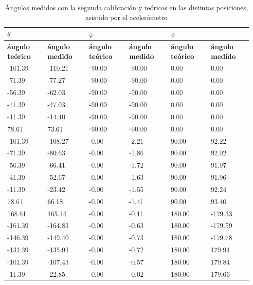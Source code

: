 \documentclass[main]{subfiles}
\begin{document}
\begin{table}
\begin{tabular}{|p{50pt}|p{50pt}|p{50pt}|p{51pt}|p{50pt}|p{50pt}|}
\hline
  
\multicolumn{2}{|p{113pt}|}{\cellcolor[gray]{0.6} $\theta$}  
& \multicolumn{2}{|p{114pt}|}{\cellcolor[gray]{0.6} $\varphi$}
& \multicolumn{2}{|p{113pt}|}{\cellcolor[gray]{0.6} $\psi$} 
\\ \hline 
   

 \multicolumn{1}{|p{50pt}|}{\cellcolor[gray]{0.7} \textbf{\'angulo te\'orico }} 
& \multicolumn{1}{|p{50pt}|}{\cellcolor[gray]{0.8} \textbf{ángulo medido}}
& \multicolumn{1}{|p{50pt}|}{\cellcolor[gray]{0.7} \textbf{\'angulo te\'orico }} 
& \multicolumn{1}{|p{50pt}|}{\cellcolor[gray]{0.8} \textbf{ángulo medido}}
& \multicolumn{1}{|p{50pt}|}{\cellcolor[gray]{0.7} \textbf{\'angulo te\'orico }} 
& \multicolumn{1}{|p{50pt}|}{\cellcolor[gray]{0.8} \textbf{ángulo medido}}
\\ \hline

-101.39&-110.21&-90.00&-90.00&  0.00&   0.00\\ \hline
 -71.39& -77.27&-90.00&-90.00&  0.00&   0.00\\ \hline
 -56.39& -62.03&-90.00&-90.00&  0.00&   0.00\\ \hline
 -41.39& -47.03&-90.00&-90.00&  0.00&   0.00\\ \hline
 -11.39& -14.40&-90.00&-90.00&  0.00&   0.00\\ \hline
  78.61&  73.61&-90.00&-90.00&  0.00&   0.00\\ \hline
-101.39&-108.27& -0.00& -2.21& 90.00&  92.22\\ \hline
 -71.39& -80.63& -0.00& -1.86& 90.00&  92.02\\ \hline
 -56.39& -66.41& -0.00& -1.72& 90.00&  91.97\\ \hline
 -41.39& -52.67& -0.00& -1.63& 90.00&  91.96\\ \hline
 -11.39& -23.42& -0.00& -1.55& 90.00&  92.24\\ \hline
  78.61&  66.18& -0.00& -1.41& 90.00&  93.40\\ \hline
 168.61& 165.14& -0.00& -0.11&180.00&-179.33\\ \hline
-161.39&-164.83& -0.00& -0.63&180.00&-179.59\\ \hline
-146.39&-149.40& -0.00& -0.73&180.00&-179.78\\ \hline
-131.39&-135.93& -0.00& -0.72&180.00& 179.94\\ \hline
-101.39&-107.43& -0.00& -0.57&180.00& 179.84\\ \hline
 -11.39& -22.85& -0.00& -0.02&180.00& 179.66\\ \hline
\end{tabular}
\caption{Ángulos medidos con la segunda calibración y teóricos en las distintas posiciones, asistido por el aceler\'ometro}
\label{tab:angulosacc}
\end{table} 
\end{document}
